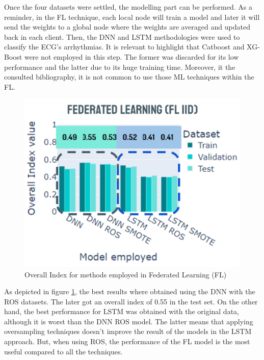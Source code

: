 Once the four datasets were settled, the modelling part can be performed. As a reminder, in the FL technique, each local node will train a model and later it will send the weights to a global node where the weights are averaged and updated back in each client. Then, the DNN and LSTM methodologies were used to classify the ECG's arrhythmias. It is relevant to highlight that Catboost and XG-Boost were not employed in this step. The former was discarded for its low performance and the latter due to its huge training time. Moreover, it the consulted bibliography, it is not common to use those ML techniques within the FL.

\begin{figure}[H]
\centering
\includegraphics[scale=0.6]{img/fl_iid_methods.png}
\caption{Overall Index for methods employed in Federated Learning (FL)}
\label{fig:fl_iid_methods}
\end{figure}

As depicted in figure \ref{fig:fl_iid_methods}, the best results where obtained using the DNN with the ROS datasets. The later got an overall index of 0.55 in the test set. On the other hand, the best performance for LSTM was obtained with the original data, although it is worst than the DNN ROS model. The latter means that applying oversampling techniques doesn't improve the result of the models in the LSTM approach. But, when using ROS, the performance of the FL model is the most useful compared to all the techniques.

